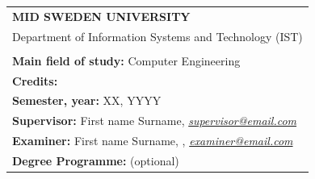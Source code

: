 \newcommand{\email}[1]{\href{mailto:#1}{\textit{#1}}}

\begin{titlepage}
  \setlength\headheight{60pt}
  \renewcommand{\headrulewidth}{0pt}
  \thispagestyle{fancy}
  \fancyhf{}
  \fancyfoot{}
    \vspace*{0.5cm}
    {\selectfont{%
    	\Large{\textbf{\gettitle}}}
      \\
      \\
      \large{} %
    \\
    \\
    \\
    	\large{\getauthor}}
    \vspace*{13cm}

    \renewcommand{\arraystretch}{0.5}
    \begin{tabular}{l}
    \footnotesize{\textbf{MID SWEDEN UNIVERSITY}}\\
    \footnotesize{Department of Information Systems and Technology (IST)}\\
          \\

      \footnotesize{\textbf{Main field of study:} Computer Engineering }\\
      \footnotesize{\textbf{Credits:}  }\\
      \footnotesize{\textbf{Semester, year:} XX, YYYY}\\
      \footnotesize{\textbf{Supervisor:} First name Surname, \email{supervisor@email.com}}\\
      \footnotesize{\textbf{Examiner:} First name Surname, , \email{examiner@email.com}}\\
      \footnotesize{\textbf{Degree Programme:} (optional)}\\
    \end{tabular}
  \end{titlepage}
